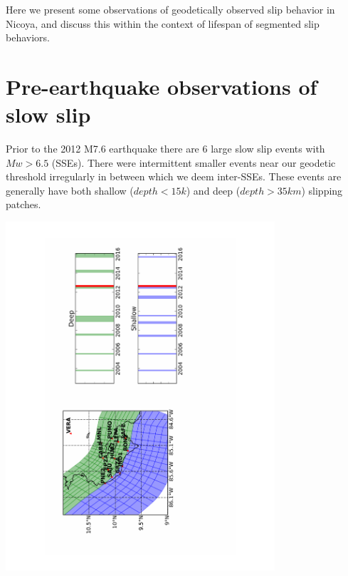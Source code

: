 \documentclass[a0,landscape]{a0poster}
\begin{document}
\begin{multicols}{5}
Here we present some observations of geodetically observed slip behavior in Nicoya, and discuss this within the context of lifespan of segmented slip behaviors. 


\color{SaddleBrown}
\section*{Pre-earthquake observations of slow slip}
\color{DarkSlateGray}
Prior to the 2012 M7.6 earthquake there are 6 large slow slip events with $Mw>6.5$ (SSEs). There were intermittent smaller events near our geodetic threshold irregularly in between which we deem inter-SSEs. These events are generally have both shallow ($depth<15k$) and deep ($depth > 35km$) slipping patches.    
\begin{center}\vspace{0.2cm}
	\includegraphics[width = 10cm, angle = -90, trim = 4.5cm 0cm 5.5cm 0cm,clip ]{timeline6.pdf}
\end{center}\vspace{0.2cm}


\end{multicols}
\end{document}

